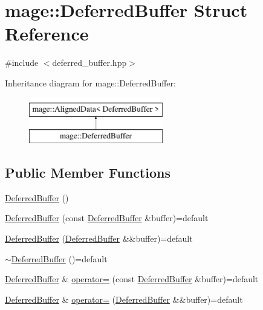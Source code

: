 \hypertarget{structmage_1_1_deferred_buffer}{}\section{mage\+:\+:Deferred\+Buffer Struct Reference}
\label{structmage_1_1_deferred_buffer}


{\ttfamily \#include $<$deferred\+\_\+buffer.\+hpp$>$}

Inheritance diagram for mage\+:\+:Deferred\+Buffer\+:\begin{figure}[H]
\begin{center}
\leavevmode
\includegraphics[height=2.000000cm]{structmage_1_1_deferred_buffer}
\end{center}
\end{figure}
\subsection*{Public Member Functions}
\begin{DoxyCompactItemize}
\item 
\hyperlink{structmage_1_1_deferred_buffer_a98f0859ebb636565f313078bb16bcc83}{Deferred\+Buffer} ()
\item 
\hyperlink{structmage_1_1_deferred_buffer_ad796b5dcb9cf2e912a08054f2be16692}{Deferred\+Buffer} (const \hyperlink{structmage_1_1_deferred_buffer}{Deferred\+Buffer} \&buffer)=default
\item 
\hyperlink{structmage_1_1_deferred_buffer_a525c6c26dfe871840328ee8953765071}{Deferred\+Buffer} (\hyperlink{structmage_1_1_deferred_buffer}{Deferred\+Buffer} \&\&buffer)=default
\item 
\hyperlink{structmage_1_1_deferred_buffer_ab5ffca775b2dc3191957fcecac894157}{$\sim$\+Deferred\+Buffer} ()=default
\item 
\hyperlink{structmage_1_1_deferred_buffer}{Deferred\+Buffer} \& \hyperlink{structmage_1_1_deferred_buffer_ac607233d2d165aefd48d0769ebb67999}{operator=} (const \hyperlink{structmage_1_1_deferred_buffer}{Deferred\+Buffer} \&buffer)=default
\item 
\hyperlink{structmage_1_1_deferred_buffer}{Deferred\+Buffer} \& \hyperlink{structmage_1_1_deferred_buffer_aaeebd1fa5bf16034b26c0416930859a3}{operator=} (\hyperlink{structmage_1_1_deferred_buffer}{Deferred\+Buffer} \&\&buffer)=default
\end{DoxyCompactItemize}
